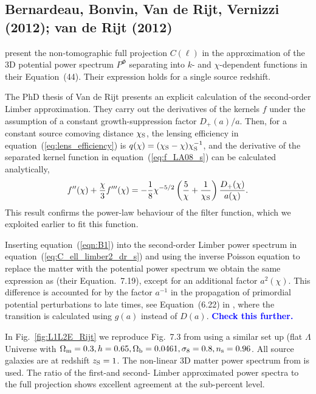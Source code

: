 \documentclass[fleqn,usenatbib]{mnras} %
\newcommand{\mk}[1]{{\bf\textcolor{blue}{#1}}}
\begin{document}
\begin{appendix}
\subsection{Bernardeau, Bonvin, Van de Rijt, Vernizzi (2012); van de Rijt (2012)}

\cite{2012PhRvD..86b3001B} present the non-tomographic full projection
$C(\ell)$ in the approximation of the 3D potential power spectrum $P^\Phi$ separating
into $k$- and $\chi$-dependent functions in their Equation~(44). Their expression holds for a single
source redshift.

The PhD thesis of Van de Rijt \cite{vande2012} presents an explicit calculation
of the second-order Limber approximation. They carry out the derivatives of the
kernels $f$ under the assumption of a constant growth-suppression factor
$D_+(a)/a$. Then, for a constant source comoving distance $\chi_{\rm S}$, the
lensing efficiency in equation~(\ref{eq:lens_efficiency}) is $q(\chi) = (\chi_{\rm S} -
\chi) \chi_{\rm S}^{-1}$, and the derivative of the separated kernel function in equation~(\ref{eq:f_LA08_s}) can be calculated analytically,
%
\begin{equation}
  f^{\prime\prime}(\chi) + \frac{\chi}{3} f^{\prime\prime\prime}(\chi)
    = - \frac 1 8 \chi^{-5/2} \left( \frac 5 \chi
          + \frac 1 {\chi_{\rm S}} \right) \frac{D_+(\chi)}{a(\chi)}.
\label{eqn:B1}
\end{equation}
%
This result confirms the power-law behaviour of the filter function, which we exploited earlier to fit
this function.

Inserting equation~(\ref{eqn:B1}) into the second-order Limber power spectrum
in equation~(\ref{eq:C_ell_limber2_dr_s}) and using the inverse Poisson equation to replace
the matter with the potential power spectrum we obtain the same expression as
\cite{vande2012} (their Equation.~7.19), except for an additional factor $a^2(\chi)$.
This difference is accounted for by the factor $a^{-1}$ in the propagation of
primordial potential perturbations to late times, see Equation~(6.22) in
\cite{vande2012}, where the transition is calculated using $g(a)$ instead of $D(a)$.
\mk{Check this further.}

In Fig.~\ref{fig:L1L2E_Rijt} we reproduce Fig.~7.3 from \cite{vande2012} using
a similar set up (flat $\Lambda$ Universe with $\Omega_{\rm m} = 0.3, h=0.65,
\Omega_{\rm b} = 0.0461, \sigma_8 = 0.8, n_{\rm s} = 0.96$. All source galaxies
are at redshift $z_{\rm S} = 1$. The non-linear 3D matter power spectrum from
\cite{2012ApJ...761..152T} is used. The ratio of the first-and second- Limber
approximated power spectra to the full projection shows excellent agreement at
the sub-percent level.


\end{appendix}
\end{document}
